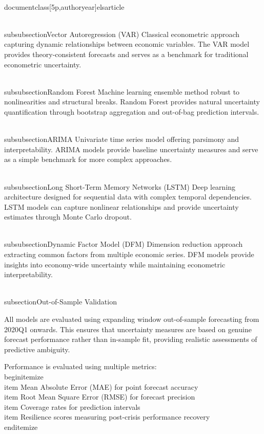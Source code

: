\\documentclass[5p,authoryear]{elsarticle}
\begin{document}
\\subsubsection{Vector Autoregression (VAR)}
Classical econometric approach capturing dynamic relationships between economic variables. The VAR model provides theory-consistent forecasts and serves as a benchmark for traditional econometric uncertainty.

\\subsubsection{Random Forest}
Machine learning ensemble method robust to nonlinearities and structural breaks. Random Forest provides natural uncertainty quantification through bootstrap aggregation and out-of-bag prediction intervals.

\\subsubsection{ARIMA}
Univariate time series model offering parsimony and interpretability. ARIMA models provide baseline uncertainty measures and serve as a simple benchmark for more complex approaches.

\\subsubsection{Long Short-Term Memory Networks (LSTM)}
Deep learning architecture designed for sequential data with complex temporal dependencies. LSTM models can capture nonlinear relationships and provide uncertainty estimates through Monte Carlo dropout.

\\subsubsection{Dynamic Factor Model (DFM)}
Dimension reduction approach extracting common factors from multiple economic series. DFM models provide insights into economy-wide uncertainty while maintaining econometric interpretability.

\\subsection{Out-of-Sample Validation}

All models are evaluated using expanding window out-of-sample forecasting from 2020Q1 onwards. This ensures that uncertainty measures are based on genuine forecast performance rather than in-sample fit, providing realistic assessments of predictive ambiguity.

Performance is evaluated using multiple metrics:
\\begin{itemize}
    \\item Mean Absolute Error (MAE) for point forecast accuracy
    \\item Root Mean Square Error (RMSE) for forecast precision
    \\item Coverage rates for prediction intervals
    \\item Resilience scores measuring post-crisis performance recovery
\\end{itemize}
\end{document}
